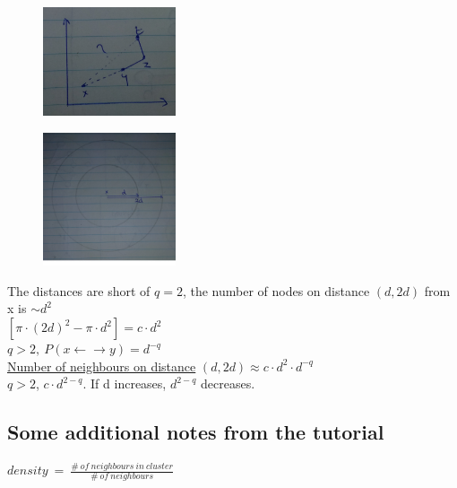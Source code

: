 \documentclass[12pt]{scrartcl}
\begin{document}
\begin{figure}[h]
	\centering
	\includegraphics[width=0.35\textwidth]{./images/fig10.jpg} 
\end{figure}

\begin{figure}[h]
	\centering
	\includegraphics[width=0.35\textwidth]{./images/fig11.jpg} 
\end{figure}

\noindent The distances are short of $q=2$, the number of nodes on distance $(d,2d)$ from x is $\sim d^{2}$\\
$[\pi\cdot (2d)^{2} - \pi\cdot d^{2}] = c\cdot d^{2}$\\
$q>2,\ P(x \gets \to y) = d^{-q}$\\
\underline{Number of neighbours on distance} $(d,2d) \approx c\cdot d^{2}\cdot d^{-q}$\\
$q>2$, $c\cdot d^{2-q}$. If d increases, $d^{2-q}$ decreases.

\subsection{Some additional notes from the tutorial}
$density\ =\ \frac{\#\ of\ neighbours\ in\ cluster}{\#\ of\ neighbours}$
\end{document}

